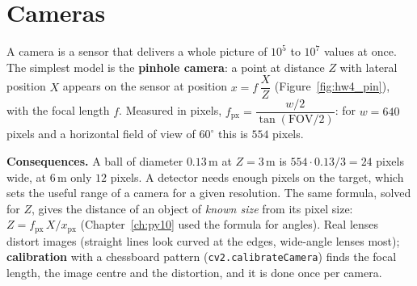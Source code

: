 \section*{Cameras}
A camera is a sensor that delivers a whole picture of $10^5$ to $10^7$ values at once. The simplest model is the \textbf{pinhole camera}: a point at distance $Z$ with lateral position $X$ appears on the sensor at position $x=f\,\dfrac{X}{Z}$ (Figure~\ref{fig:hw4_pin}), with the focal length $f$. Measured in pixels, $f_\text{px}=\dfrac{w/2}{\tan(\text{FOV}/2)}$: for $w=640$ pixels and a horizontal field of view of $60^\circ$ this is $554$ pixels.
\begin{center}
\label{fig:hw4_pin}
\end{center}
\textbf{Consequences.} A ball of diameter $0.13$\,m at $Z=3$\,m is $554\cdot0.13/3=24$ pixels wide, at $6$\,m only $12$ pixels. A detector needs enough pixels on the target, which sets the useful range of a camera for a given resolution. The same formula, solved for $Z$, gives the distance of an object of \emph{known size} from its pixel size: $Z=f_\text{px}\,X/x_\text{px}$ (Chapter~\ref{ch:py10} used the formula for angles). Real lenses distort images (straight lines look curved at the edges, wide-angle lenses most); \textbf{calibration} with a chessboard pattern (\texttt{cv2.calibrateCamera}) finds the focal length, the image centre and the distortion, and it is done once per camera.

